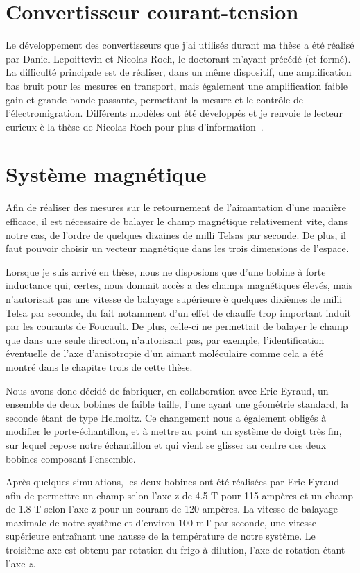 \section{Convertisseur courant-tension}
Le développement des convertisseurs que j’ai utilisés durant ma thèse a été réalisé par Daniel Lepoittevin et Nicolas Roch, le doctorant m’ayant précédé (et formé). La difficulté principale est de réaliser, dans un même
dispositif, une amplification bas bruit pour les mesures en transport, mais également une amplification faible gain et grande bande passante, permettant la mesure et le contrôle de l’électromigration. Différents modèles ont été développés et je renvoie le lecteur curieux è la thèse de Nicolas Roch pour plus d’information~\cite{RochPhd}.


\section{Système magnétique}
Afin de réaliser des mesures sur le retournement de l’aimantation d’une manière efficace, il est nécessaire de balayer le champ magnétique relativement vite, dans notre cas, de l’ordre de quelques dizaines de milli Telsas par seconde. De plus, il faut pouvoir choisir un vecteur magnétique dans les trois dimensions de l’espace.

Lorsque je suis arrivé en thèse, nous ne disposions que d’une bobine à forte inductance qui, certes, nous donnait accès a des champs magnétiques élevés, mais n’autorisait pas une vitesse de balayage supérieure è quelques
dixièmes de milli Telsa par seconde, du fait notamment d’un effet de chauffe trop important induit par les courants de Foucault. De plus, celle-ci ne permettait de balayer le champ que dans une seule direction, n’autorisant pas, par exemple, l’identification éventuelle de l’axe d’anisotropie d’un aimant moléculaire comme cela a été montré dans le chapitre trois de cette thèse. 

Nous avons donc décidé de fabriquer, en collaboration avec Eric Eyraud, un ensemble de deux bobines de faible taille, l’une ayant une géométrie standard, la seconde étant de type Helmoltz. Ce changement nous a également
obligés à modifier le porte-échantillon, et à mettre au point un système de doigt très fin, sur lequel repose notre échantillon et qui vient se glisser au centre des deux bobines composant l’ensemble.

Après quelques simulations, les deux bobines ont été réalisées par Eric Eyraud afin de permettre un champ selon l’axe z de 4.5 T pour 115 ampères et un champ de 1.8 T selon l’axe z pour un courant de 120 ampères. La vitesse
de balayage maximale de notre système et d’environ 100 mT par seconde, une vitesse supérieure entraînant une hausse de la température de notre système. Le troisième axe est obtenu par rotation du frigo à dilution, l’axe de rotation étant l’axe $z$.

